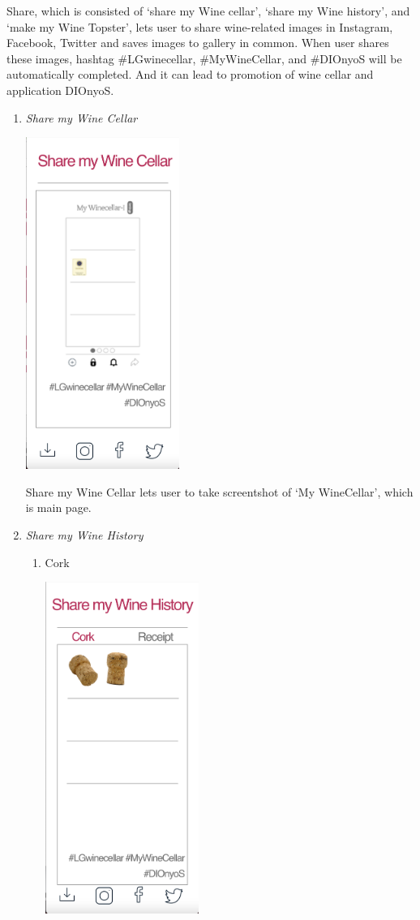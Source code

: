 \documentclass[conference]{IEEEtran}
\numberwithin{figure}{subsection}
\begin{document}
\begin{enumerate}
\begin{enumerate}
        Share, which is consisted of ‘share my Wine cellar’, ‘share my Wine history’, and ‘make my Wine Topster’, lets user to share wine-related images in Instagram, Facebook, Twitter and saves images to gallery in common. When user shares these images, hashtag \#LGwinecellar, \#MyWineCellar, and \#DIOnyoS will be automatically completed. And it can lead to promotion of wine cellar and application DIOnyoS.
        \begin{enumerate}
        \item \textit{Share my Wine Cellar}\\
        \centerline{\includegraphics[width=5cm]{sharecel.png}}
        Share my Wine Cellar lets user to take screentshot of ‘My WineCellar’, which is main page.
        \item \textit{Share my Wine History}\\
        \begin{enumerate}
            \item Cork\\
            \centerline{\includegraphics[width=5cm]{sharecork.png}}

\end{enumerate}
\end{enumerate}
\end{enumerate}
\end{enumerate}
\end{document}
